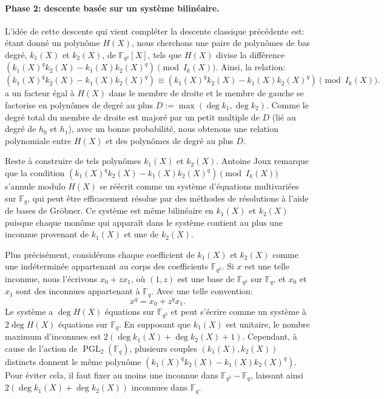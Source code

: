\documentclass[a4paper, titlepage, 11pt]{article}
\theoremstyle{definition}
\theoremstyle{remark}
\def\gf #1{\mathbb{F}_{#1}}
\begin{document}
\paragraph{Phase 2: descente basée sur un système bilinéaire.}L'idée de cette descente qui vient compléter la descente classique précédente est: étant donné un polynôme $H(X)$, nous cherchons une paire de polynômes de bas degré, $k_1(X)$ et $k_2(X)$, de $\gf{q^2}[X]$, tels que $H(X)$ divise la différence $(k_1(X)^qk_2(X)-k_1(X)k_2(X)^q) \pmod{I_k(X)}$. Ainsi, la relation:
$$(k_1(X)^qk_2(X)-k_1(X)k_2(X)^q) \equiv (k_1(X)^qk_2(X)-k_1(X)k_2(X)^q) \pmod{I_k(X)}.$$
a un facteur égal à $H(X)$ dans le membre de droite et le membre de gauche se factorise en polynômes de degré au plus $D := \max(\deg k_1, \deg k_2)$. Comme le degré total du membre de droite est majoré par un petit multiple de $D$ (lié au degré de $h_0$ et $h_1$), avec un bonne probabilité, nous obtenons une relation polynomiale entre $H(X)$ et des polynômes de degré au plus $D$.

Reste à construire de tels polynômes $k_1(X)$ et $k_2(X)$. Antoine Joux \cite{joux2013} remarque que la condition $(k_1(X)^qk_2(X)-k_1(X)k_2(X)^q) \pmod{I_k(X)}$ s'annule modulo $H(X)$ se réécrit comme un système d'équations multivariées sur $\gf{q}$, qui peut être efficacement résolue par des méthodes de résolutions à l'aide de bases de Gröbner. 
Ce système est même bilinéaire en $k_1(X)$ et $k_2(X)$ puisque chaque monôme qui apparaît dans le système contient au plus une inconnue provenant de $k_1(X)$ et une de $k_2(X)$.

Plus précisément, considérons chaque coefficient de $k_1(X)$ et $k_2(X)$ comme une indéterminée appartenant au corps des coefficients $\gf{q^2}$. Si $x$ est une telle inconnue, nous l'écrivons $x_0 + zx_1$, où $(1,z)$ est une base de $\gf{q^2}$ sur $\gf{q}$, et $x_0$ et $x_1$ sont des inconnues appartenant à $\gf{q}$. Avec une telle convention: $$x^q = x_0 + z^qx_1.$$
Le système a $\deg H(X)$ équations sur $\gf{q^2}$ et peut s'écrire comme un système à $2\deg H(X)$ équations sur $\gf{q}$. En supposant que $k_1(X)$ est unitaire, le nombre maximum d'inconnues est $2(\deg k_1(X) + \deg k_2(X) + 1)$. Cependant, à cause de l'action de $\operatorname{PGL}_2(\gf{q})$, plusieurs couples $(k_1(X),k_2(X))$ distincts donnent le même polynôme $(k_1(X)^qk_2(X)-k_1(X)k_2(X)^q)$. Pour éviter cela, il faut fixer au moins une inconnue dans $\gf{q^2} - \gf{q}$, laissant ainsi $2(\deg k_1(X) + \deg k_2(X))$ inconnues dans $\gf{q}$. 
\end{document}

